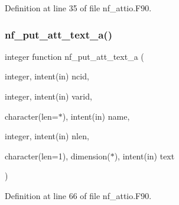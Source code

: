 Definition at line 35 of file nf\+\_\+attio.\+F90.

\mbox{\label{nf__attio_8F90_a09bd32157a8ceb738172fade0722ffb8}} 
\subsubsection{\texorpdfstring{nf\+\_\+put\+\_\+att\+\_\+text\+\_\+a()}{nf\_put\_att\_text\_a()}}
{\footnotesize\ttfamily integer function nf\+\_\+put\+\_\+att\+\_\+text\+\_\+a (\begin{DoxyParamCaption}\item[{integer, intent(in)}]{ncid,  }\item[{integer, intent(in)}]{varid,  }\item[{character(len=$\ast$), intent(in)}]{name,  }\item[{integer, intent(in)}]{nlen,  }\item[{character(len=1), dimension($\ast$), intent(in)}]{text }\end{DoxyParamCaption})}



Definition at line 66 of file nf\+\_\+attio.\+F90.

